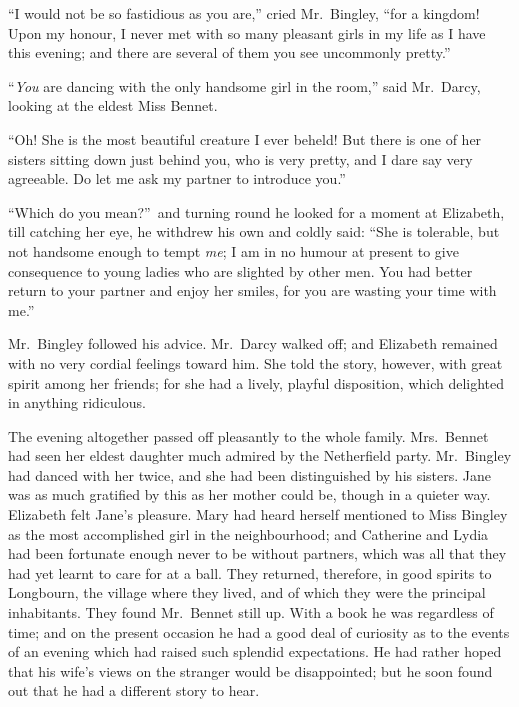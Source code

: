\documentclass[12pt,english]{book}
\begin{document}
{}``I would not be so fastidious as you are,'' cried Mr.\ Bingley,
{}``for a kingdom! Upon my honour, I never met with so many pleasant
girls in my life as I have this evening; and there are several of
them you see uncommonly pretty.''

{}``\textit{You} are dancing with the only handsome girl in the room,''
said Mr.\ Darcy, looking at the eldest Miss Bennet.

{}``Oh! She is the most beautiful creature I ever beheld! But there
is one of her sisters sitting down just behind you, who is very pretty,
and I dare say very agreeable. Do let me ask my partner to introduce
you.''

{}``Which do you mean?''\ and turning round he looked for a moment
at Elizabeth, till catching her eye, he withdrew his own and coldly
said: {}``She is tolerable, but not handsome enough to tempt \textit{me};
I am in no humour at present to give consequence to young ladies who
are slighted by other men. You had better return to your partner and
enjoy her smiles, for you are wasting your time with me.''

Mr.\ Bingley followed his advice. Mr.\ Darcy walked off; and Elizabeth
remained with no very cordial feelings toward him. She told the story,
however, with great spirit among her friends; for she had a lively,
playful disposition, which delighted in anything ridiculous.

The evening altogether passed off pleasantly to the whole family.
Mrs.\ Bennet had seen her eldest daughter much admired by the Netherfield
party. Mr.\ Bingley had danced with her twice, and she had been distinguished
by his sisters. Jane was as much gratified by this as her mother could
be, though in a quieter way. Elizabeth felt Jane's pleasure. Mary
had heard herself mentioned to Miss Bingley as the most accomplished
girl in the neighbourhood; and Catherine and Lydia had been fortunate
enough never to be without partners, which was all that they had yet
learnt to care for at a ball. They returned, therefore, in good spirits
to Longbourn, the village where they lived, and of which they were
the principal inhabitants. They found Mr.\ Bennet still up. With
a book he was regardless of time; and on the present occasion he had
a good deal of curiosity as to the events of an evening which had
raised such splendid expectations. He had rather hoped that his wife's
views on the stranger would be disappointed; but he soon found out
that he had a different story to hear.
\end{document}
